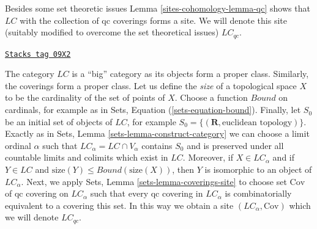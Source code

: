 Besides some set theoretic issues Lemma \ref{sites-cohomology-lemma-qc} shows that
$\textit{LC}$ with the collection of qc coverings forms a site.
We will denote this site (suitably modified to overcome the
set theoretical issues)
$\textit{LC}_{qc}$.

\begin{remark}

\label{sites-cohomology-remark-set-theoretic-LC}
\href{https://stacks.math.columbia.edu/tag/09X2}{\texttt{Stacks tag 09X2}}

The category $\textit{LC}$ is a ``big'' category as its objects form
a proper class. Similarly, the coverings form a proper class.
Let us define the {\it size} of a topological space $X$ to be the
cardinality of the set of points of $X$. Choose a function
$Bound$ on cardinals, for example as in
Sets, Equation (\ref{sets-equation-bound}).
Finally, let $S_0$ be an initial set of objects of $\textit{LC}$,
for example $S_0 = \{(\mathbf{R}, \text{euclidean topology})\}$.
Exactly as in Sets, Lemma \ref{sets-lemma-construct-category}
we can choose a limit ordinal $\alpha$ such that
$\textit{LC}_\alpha = \textit{LC} \cap V_\alpha$
contains $S_0$ and is preserved under all countable limits and
colimits which exist in $\textit{LC}$. Moreover, if $X \in \textit{LC}_\alpha$
and if $Y \in \textit{LC}$ and
$\text{size}(Y) \leq Bound(\text{size}(X))$, then $Y$ is isomorphic
to an object of $\textit{LC}_\alpha$.
Next, we apply Sets, Lemma \ref{sets-lemma-coverings-site}
to choose set $\text{Cov}$ of qc covering on $\textit{LC}_\alpha$
such that every qc covering in $\textit{LC}_\alpha$ is
combinatorially equivalent to a covering this set.
In this way we obtain a site $(\textit{LC}_\alpha, \text{Cov})$
which we will denote $\textit{LC}_{qc}$.
\end{remark}

